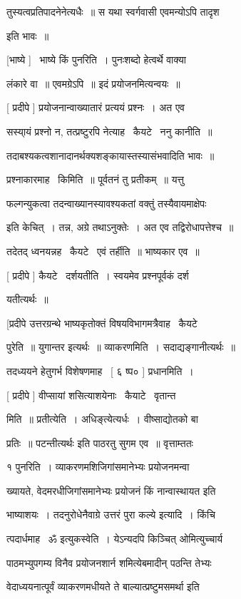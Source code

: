 \documentclass[11pt, openany]{book}
\begin{document}
तुस्यत्वप्रतिपादनेनेत्यधैः~॥ स यथा स्वर्गवासी एवमन्योऽपि तादृश 

इति भावः~॥ 

[भाष्ये ] \textendash\ भाष्ये किं पुनरिति~। पुनःशब्दो हेत्वर्थे वाक्या \textendash\ 

लंकारे वा~॥ एवमग्रेऽपि~॥ इदं प्रयोजनमित्यन्वयः~॥ 

[ प्रदीपे ] प्रयोजनान्वाख्यातारं प्रत्ययं प्रश्नः~। अत एव 

सस्या्यं प्रश्नो न, तत्प्रष्टुरपि नेत्याह \textendash\ कैयटे \textendash\ ननु कानीति~॥ 

तदाबश्यकत्वशानादानर्थक्यशङ्कायास्तस्यासंभवादिति भावः~॥ 

प्रश्नाकारमाह \textendash\ किमिति~॥ पूर्वतनं तु प्रतीकम्~॥ यत्तु \textendash\ 

फल्गन्युकत्वा तदन्वाख्यानस्यावश्यकतां वक्तुं तस्यैवायमाक्षेपः \textendash\ 

इति केचित्~। तन्न, अग्रे तथाऽनुक्तेः~। अत एव तद्विरोधापत्तेश्च~॥ 

तदेतद् ध्वनयन्नह \textendash\ कैयटे \textendash\ एवं तर्हीति~॥ भाष्यकार एव~॥ 

[ प्रदीपे ] कैयटे \textendash\ दर्शयतीति~। स्वयमेव प्रश्नपूर्वकं दर्श \textendash\ 

यतीत्यर्थः~॥ 

[प्रदीपे उत्तरग्रन्थे भाष्यकृतोक्तं विषयविभागमत्रैवाह \textendash\ कैयटे \textendash\ 

पुरेति~॥ युगान्तर इत्यर्थः~॥ व्याकरणमिति~। सदाद्यङ्गानीत्यर्थः~॥ 

तदध्ययने हेतुगर्भ विशेषणमाह \textendash\ [ ६ ष्प० ] प्रधानमिति~। 

[ प्रदीपे ] वीप्सायां शसित्याशयेनाः \textendash\ कैयाटे \textendash\ वृतान्त 

मिति~॥ प्रतीत्येति~। अधिङ्त्येत्यर्धः~। वीष्साद्योतको बा 

प्रतिः~॥ {\qt पटन्तीत्यर्थः} इति पाठरतु सुगम एव~॥ {\qt वृत्ताम्ततः}

१ पुनरिति~। व्याकरणमशिजिगांसमानेभ्यः प्रयोजनमन्वा \textendash\ 

ख्यायते, वेदमरधीजिगांसमानेभ्यः प्रयोजनं किं नान्वास्थायत इति 

भाष्याशयः~। तदनुरोधेनैवाग्रे उत्तरं पुरा कल्ये इत्यादि~। किंचि \textendash\ 

त्पदार्धमाह \textendash\ ॐ इत्युकस्वेति~। येऽन्यदपि किञ्चित् ओमित्युच्चार्य \textendash\ 

पाठमभ्युपगम्य विनैव प्रयोजनशार्न शमित्येबमादीन् पठन्ति तेभ्यः 

वेदाध्ययनात्पूर्वं व्याकरणमधीयते ते बाल्यात्प्रष्टुमसमर्था इति 
\end{document}
